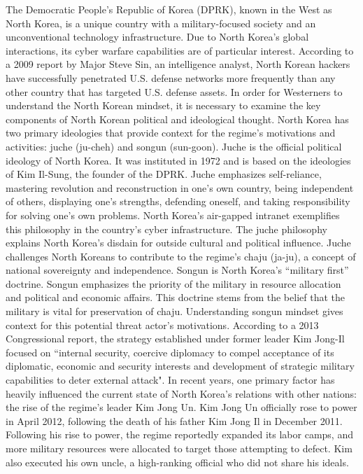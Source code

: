\documentclass[12pt]{article}
\begin{document}
        The Democratic People’s Republic of Korea (DPRK), known in the West as North Korea, is a unique country with a military-focused society and an unconventional technology infrastructure. Due to North Korea’s global interactions, its cyber warfare capabilities are of particular interest. According to a 2009 report by Major Steve Sin, an intelligence analyst, North Korean hackers have successfully penetrated U.S. defense networks more frequently than any other country that has targeted U.S. defense assets. In order for Westerners to understand the North Korean mindset, it is necessary to examine the key components of North Korean political and ideological thought. North Korea has two primary ideologies that provide context for the regime’s motivations and activities: juche (ju-cheh) and songun (sun-goon). Juche is the official political ideology of North Korea. It was instituted in 1972 and is based on the ideologies of Kim Il-Sung, the founder of the DPRK. Juche emphasizes self-reliance, mastering revolution and reconstruction in one’s own country, being independent of others, displaying one’s strengths, defending oneself, and taking responsibility for solving one’s own problems. North Korea’s air-gapped intranet exemplifies this philosophy in the country’s cyber infrastructure. The juche philosophy explains North Korea’s disdain for outside cultural and political influence. Juche challenges North Koreans to contribute to the regime’s chaju (ja-ju), a concept of national sovereignty and independence. Songun is North Korea’s “military first” doctrine. Songun emphasizes the priority of the military in resource allocation and political and economic affairs. This doctrine stems from the belief that the military is vital for preservation of chaju. Understanding songun mindset gives context for this potential threat actor’s motivations. According to a 2013 Congressional report, the strategy established under former leader Kim Jong-Il focused on “internal security, coercive diplomacy to compel acceptance of its diplomatic, economic and security interests and development of strategic military capabilities to deter external attack". 
        In recent years, one primary factor has heavily influenced the current state of North Korea’s relations with other nations: the rise of the regime’s leader Kim Jong Un. Kim Jong Un officially rose to power in April 2012, following the death of his father Kim Jong Il in December 2011. Following his rise to power, the regime reportedly expanded its labor camps, and more military resources were allocated to target those attempting to defect. Kim also executed his own uncle, a high-ranking official who did not share his ideals. 
        
\end{document}
